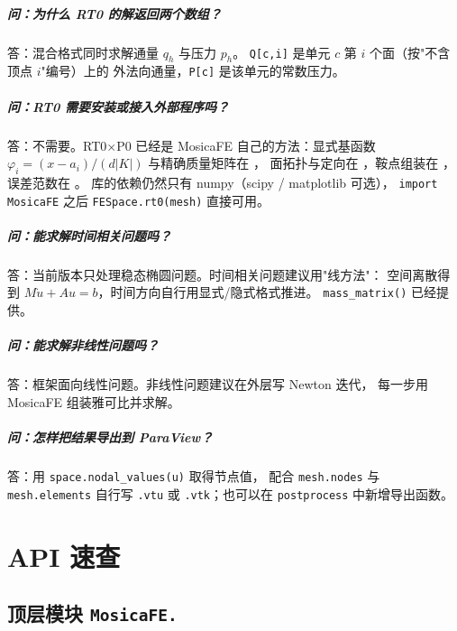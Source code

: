\documentclass[UTF8,11pt,oneside]{ctexbook}
\theoremstyle{definition}
\theoremstyle{plain}
\newcommand{\mosica}{\textsf{MosicaFE}}
\newcommand{\code}[1]{\texttt{#1}}
\newcommand{\module}[1]{\texttt{MosicaFE.#1}}
\begin{document}
\paragraph{问：为什么 RT0 的解返回两个数组？}
答：混合格式同时求解通量 $q_h$ 与压力 $p_h$。
\code{Q[c,\allowbreak i]} 是单元 $c$ 第 $i$ 个面（按"不含顶点 $i$"编号）上的
外法向通量，\code{P[c]} 是该单元的常数压力。

\paragraph{问：RT0 需要安装或接入外部程序吗？}
答：不需要。RT0$\times$P0 已经是 \mosica{} 自己的方法：显式基函数
$\varphi_i=(x-a_i)/(d|K|)$ 与精确质量矩阵在 ，
面拓扑与定向在 ，鞍点组装在
，误差范数在 。
库的依赖仍然只有 numpy（scipy / matplotlib 可选），
\code{import MosicaFE} 之后 \code{FESpace.rt0(mesh)} 直接可用。

\paragraph{问：能求解时间相关问题吗？}
答：当前版本只处理稳态椭圆问题。时间相关问题建议用"线方法"：
空间离散得到 $M\dot u+Au=b$，时间方向自行用显式/隐式格式推进。
\code{mass\_\allowbreak matrix()} 已经提供。

\paragraph{问：能求解非线性问题吗？}
答：框架面向线性问题。非线性问题建议在外层写 Newton 迭代，
每一步用 \mosica{} 组装雅可比并求解。

\paragraph{问：怎样把结果导出到 ParaView？}
答：用 \code{space.nodal\_\allowbreak values(u)} 取得节点值，
配合 \code{mesh.nodes} 与 \code{mesh.elements} 自行写
\code{.vtu} 或 \code{.vtk}；也可以在 \code{postprocess} 中新增导出函数。

\appendix

\chapter{API 速查}
\label{app:api}

\section{顶层模块 \module{}}
\end{document}
